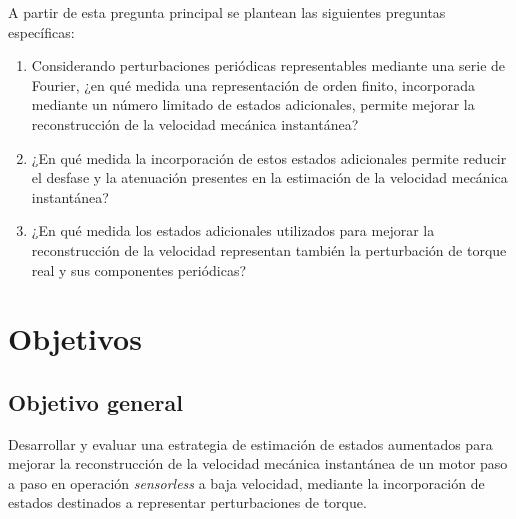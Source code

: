 A partir de esta pregunta principal se plantean las siguientes preguntas 
específicas:

\begin{enumerate}
    \item Considerando perturbaciones periódicas representables mediante una 
    serie de Fourier, ¿en qué medida una representación de orden finito, 
    incorporada mediante un número limitado de estados adicionales, permite 
    mejorar la reconstrucción de la velocidad mecánica instantánea?

    \item ¿En qué medida la incorporación de estos estados adicionales permite 
    reducir el desfase y la atenuación presentes en la estimación de la 
    velocidad mecánica instantánea?

    \item ¿En qué medida los estados adicionales utilizados para mejorar la 
    reconstrucción de la velocidad representan también la perturbación de 
    torque real y sus componentes periódicas?
\end{enumerate}
\section{Objetivos}


\subsection{Objetivo general}

%
%

Desarrollar y evaluar una estrategia de estimación de estados aumentados para mejorar la reconstrucción de la velocidad mecánica instantánea de un motor paso a paso en operación \textit{sensorless} a baja velocidad, mediante la incorporación de estados destinados a representar perturbaciones de torque.


